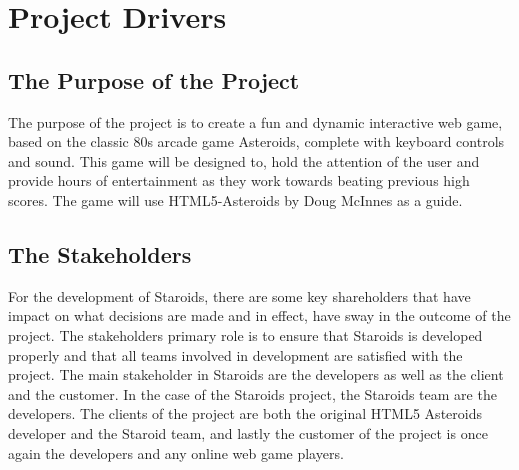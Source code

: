 \documentclass[12pt, titlepage]{article}
\begin{document}



\section{Project Drivers}

\subsection{The Purpose of the Project}
The purpose of the project is to create a fun and dynamic interactive web game, based on the classic 80s arcade game Asteroids, complete with keyboard controls and sound. This game will be designed to, hold the attention of the user and provide hours of entertainment as they work towards beating previous high scores. The game will use HTML5-Asteroids by Doug McInnes as a guide.\\

\subsection{The Stakeholders}
For the development of Staroids, there are some key shareholders that have impact on what decisions are made and in effect, have sway in the outcome of the project. The stakeholders primary role is to ensure that Staroids is developed properly and that all teams involved in development are satisfied with the project. The main stakeholder in Staroids are the developers as well as the client and the customer. In the case of the Staroids project, the Staroids team are the developers. The clients of the project are both the original HTML5 Asteroids developer and the Staroid team, and lastly the customer of the project is once again the developers and any online web game players.\\
\end{document}

